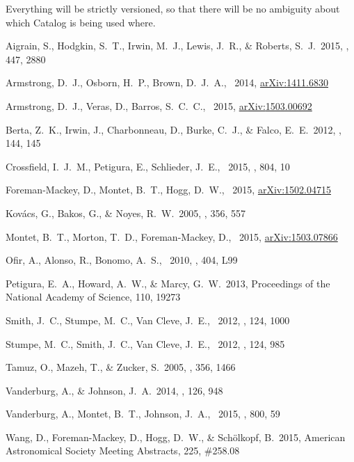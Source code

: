 \documentclass[12pt,preprint]{aastex}
\begin{document}
Everything will be strictly versioned, so that there will be no
ambiguity about which Catalog is being used where.

\clearpage
\newcommand{\arxiv}[1]{{\href{http://arxiv.org/abs/#1}{arXiv:{#1}}}}
\begin{thebibliography}{}\raggedright%

Aigrain, S., Hodgkin, S.~T., Irwin, M.~J., Lewis, J.~R., \& Roberts, S.~J.\
2015, \mnras, 447, 2880

Armstrong, D.~J., Osborn, H.~P., Brown, D.~J.~A., \etal\ 2014,
\arxiv{1411.6830}

Armstrong, D.~J., Veras, D., Barros, S.~C.~C., \etal\ 2015, \arxiv{1503.00692}

Berta, Z.~K., Irwin, J., Charbonneau, D., Burke, C.~J., \& Falco, E.~E.\ 2012,
\aj, 144, 145

Crossfield, I.~J.~M., Petigura, E., Schlieder, J.~E., \etal\ 2015, \apj, 804,
10

Foreman-Mackey, D., Montet, B.~T., Hogg, D.~W., \etal\ 2015, \arxiv{1502.04715}

Kov{\'a}cs, G., Bakos, G., \& Noyes, R.~W.\ 2005, \mnras, 356, 557

Montet, B.~T., Morton, T.~D., Foreman-Mackey, D., \etal\ 2015,
\arxiv{1503.07866}

Ofir, A., Alonso, R., Bonomo, A.~S., \etal\ 2010, \mnras, 404, L99

Petigura, E.~A., Howard, A.~W., \& Marcy, G.~W.\ 2013,
Proceedings of the National Academy of Science, 110, 19273

Smith, J.~C., Stumpe, M.~C., Van Cleve, J.~E., \etal\ 2012, \pasp, 124, 1000

Stumpe, M.~C., Smith, J.~C., Van Cleve, J.~E., \etal\ 2012, \pasp, 124, 985

Tamuz, O., Mazeh, T., \& Zucker, S.\ 2005, \mnras, 356, 1466

Vanderburg, A., \& Johnson, J.~A.\ 2014, \pasp, 126, 948

Vanderburg, A., Montet, B.~T., Johnson, J.~A., \etal\ 2015, \apj, 800, 59

Wang, D., Foreman-Mackey, D., Hogg, D.~W., \& Sch{\"o}lkopf, B.\ 2015,
American Astronomical Society Meeting Abstracts, 225, \#258.08

\end{thebibliography}
\end{document}
